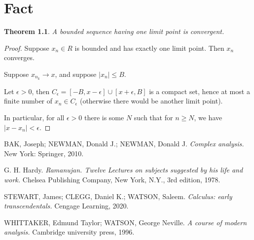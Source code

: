\documentclass{book}
\newtheorem{thm}[defi]{Theorem}
\numberwithin{equation}{section}
\begin{document}
\chapter{Fact}
\begin{thm}
A bounded sequence having one limit point is convergent.
\end{thm}
\begin{proof}
Suppose $x_n\in R$ is bounded and has exactly one limit point. Then $x_n$ converges.\medskip

Suppose $x_{n_k}\to x$, and suppose $|x_n|\leq B$. \medskip

Let $\epsilon >0$, then $C_\epsilon=[-B,x-\epsilon]\cup[x+\epsilon,B]$ is a compact set, hence at most a finite number of $x_n\in C_\epsilon$ (otherwise there would be another limit point).

In particular, for all $\epsilon>0$ there is some $N$ such that for $n\geq N$, we have $|x-x_n|<\epsilon$. 
\end{proof}

\begin{thebibliography}{99}
BAK, Joseph; NEWMAN, Donald J.; NEWMAN, Donald J. 
\textit{Complex analysis.} 
New York: Springer, 2010.

G. H. Hardy. 
\textit{Ramanujan. Twelve Lectures on subjects suggested by his life and work.}
Chelsea Publishing Company, New York, N.Y., 3rd edition, 1978.


STEWART, James; CLEGG, Daniel K.; WATSON, Saleem.
\textit{Calculus:  early transcendentals.} 
Cengage Learning, 2020.

WHITTAKER,  Edmund  Taylor;  WATSON,  George  Neville.
\textit{A course of modern analysis.}
Cambridge university press, 1996.


\end{thebibliography}
\end{document}
